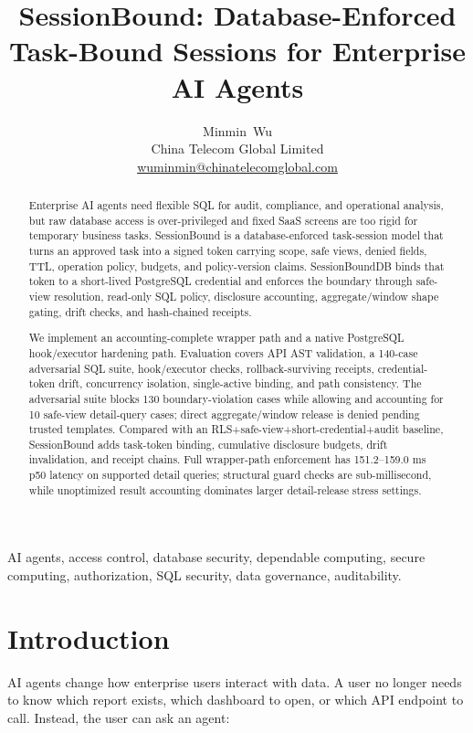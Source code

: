 \documentclass[journal]{IEEEtran}
\title{SessionBound: Database-Enforced Task-Bound Sessions for
Enterprise AI Agents}
\author{Minmin~Wu\\
China Telecom Global Limited\\
\href{mailto:wuminmin@chinatelecomglobal.com}{wuminmin@chinatelecomglobal.com}}
\begin{document}
\maketitle

\begin{abstract}
Enterprise AI agents need flexible SQL for audit, compliance, and
operational analysis, but raw database access is over-privileged and
fixed SaaS screens are too rigid for temporary business tasks.
SessionBound is a database-enforced task-session model that turns an
approved task into a signed token carrying scope, safe views, denied
fields, TTL, operation policy, budgets, and policy-version claims.
SessionBoundDB binds that token to a short-lived PostgreSQL credential
and enforces the boundary through safe-view resolution, read-only SQL
policy, disclosure accounting, aggregate/window shape gating, drift
checks, and hash-chained receipts.

We implement an accounting-complete wrapper path and a native PostgreSQL
hook/executor hardening path. Evaluation covers API AST validation, a
140-case adversarial SQL suite, hook/executor checks, rollback-surviving
receipts, credential-token drift, concurrency isolation, single-active
binding, and path consistency. The adversarial suite blocks 130
boundary-violation cases while allowing and accounting for 10 safe-view
detail-query cases; direct aggregate/window release is denied pending
trusted templates. Compared with an RLS+safe-view+short-credential+audit
baseline, SessionBound adds task-token binding, cumulative disclosure
budgets, drift invalidation, and receipt chains. Full wrapper-path
enforcement has 151.2--159.0 ms p50 latency on supported detail queries;
structural guard checks are sub-millisecond, while unoptimized result
accounting dominates larger detail-release stress settings.
\end{abstract}

\begin{IEEEkeywords}
AI agents, access control, database security, dependable computing,
secure computing, authorization, SQL security, data governance,
auditability.
\end{IEEEkeywords}

\hypertarget{introduction}{%
\section{Introduction}\label{introduction}}

AI agents change how enterprise users interact with data. A user no
longer needs to know which report exists, which dashboard to open, or
which API endpoint to call. Instead, the user can ask an agent:
\end{document}

